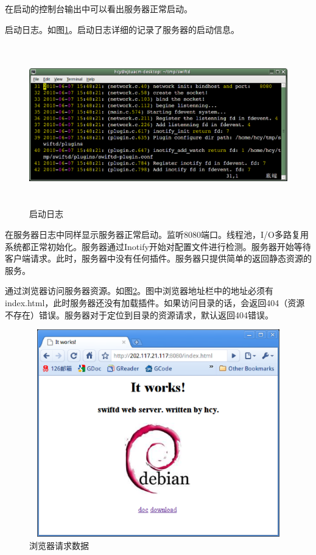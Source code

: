 \documentclass[twoside, xetex]{report}
\begin{document}
	在启动的控制台输出中可以看出服务器正常启动。
	
	启动日志。如图\ref{startuplog}。启动日志详细的记录了服务器的启动信息。
	\begin{figure}[htbp]
	\centering
	\includegraphics[height=7cm, width=16cm]{pics/startuplog.eps}
	\caption{启动日志}
	\label{startuplog}
	\end{figure}
	
	在服务器日志中同样显示服务器正常启动。监听8080端口。线程池，I/O多路复用系统都正常初始化。服务器通过Inotify开始对配置文件进行检测。服务器开始等待客户端请求。此时，服务器中没有任何插件。服务器只提供简单的返回静态资源的服务。
	
	通过浏览器访问服务器资源。如图\ref{access1}。图中浏览器地址栏中的地址必须有index.html，此时服务器还没有加载插件。如果访问目录的话，会返回404（资源不存在）错误。服务器对于定位到目录的资源请求，默认返回404错误。
	
	\begin{figure}[htbp]
	\centering
	\includegraphics[height=9cm, width=12cm]{pics/access1.eps}
	\caption{浏览器请求数据}
	\label{access1}
	\end{figure}
	
\end{document}
